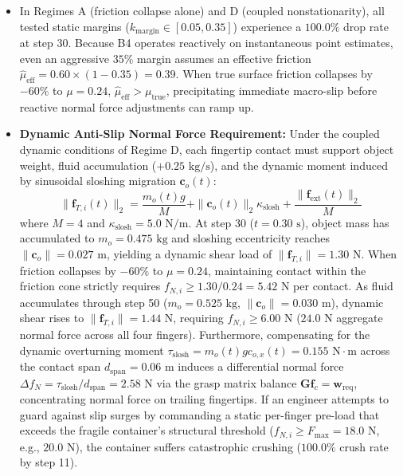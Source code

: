 \begin{itemize}
\begin{itemize}
        \item In Regimes A (friction collapse alone) and D (coupled nonstationarity), all tested static margins ($k_{\text{margin}} \in [0.05, 0.35]$) experience a $100.0\%$ drop rate at step 30. Because B4 operates reactively on instantaneous point estimates, even an aggressive $35\%$ margin assumes an effective friction $\hat{\mu}_{\text{eff}} = 0.60 \times (1 - 0.35) = 0.39$. When true surface friction collapses by $-60\%$ to $\mu = 0.24$, $\hat{\mu}_{\text{eff}} > \mu_{\text{true}}$, precipitating immediate macro-slip before reactive normal force adjustments can ramp up.
        \item \textbf{Dynamic Anti-Slip Normal Force Requirement:} Under the coupled dynamic conditions of Regime D, each fingertip contact must support object weight, fluid accumulation ($+0.25\text{ kg/s}$), and the dynamic moment induced by sinusoidal sloshing migration $\mathbf{c}_o(t)$:
        \begin{equation}
            \|\mathbf{f}_{T, i}(t)\|_2 = \frac{m_o(t) g}{M} + \|\mathbf{c}_o(t)\|_2 \kappa_{\text{slosh}} + \frac{\|\mathbf{f}_{\text{ext}}(t)\|_2}{M}
        \end{equation}
        where $M=4$ and $\kappa_{\text{slosh}} = 5.0\text{ N/m}$. At step 30 ($t = 0.30\text{ s}$), object mass has accumulated to $m_o = 0.475\text{ kg}$ and sloshing eccentricity reaches $\|\mathbf{c}_o\| = 0.027\text{ m}$, yielding a dynamic shear load of $\|\mathbf{f}_{T, i}\| = 1.30\text{ N}$. When friction collapses by $-60\%$ to $\mu = 0.24$, maintaining contact within the friction cone strictly requires $f_{N, i} \ge 1.30 / 0.24 = 5.42\text{ N}$ per contact. As fluid accumulates through step 50 ($m_o = 0.525\text{ kg}$, $\|\mathbf{c}_o\| = 0.030\text{ m}$), dynamic shear rises to $\|\mathbf{f}_{T, i}\| = 1.44\text{ N}$, requiring $f_{N, i} \ge 6.00\text{ N}$ ($24.0\text{ N}$ aggregate normal force across all four fingers). Furthermore, compensating for the dynamic overturning moment $\tau_{\text{slosh}} = m_o(t) g c_{o, x}(t) = 0.155\text{ N}\cdot\text{m}$ across the contact span $d_{\text{span}} = 0.06\text{ m}$ induces a differential normal force $\Delta f_N = \tau_{\text{slosh}} / d_{\text{span}} = 2.58\text{ N}$ via the grasp matrix balance $\mathbf{G}\mathbf{f}_c = \mathbf{w}_{\text{req}}$, concentrating normal force on trailing fingertips. If an engineer attempts to guard against slip surges by commanding a static per-finger pre-load that exceeds the fragile container's structural threshold ($f_{N, i} \ge F_{\max} = 18.0\text{ N}$, e.g., $20.0\text{ N}$), the container suffers catastrophic crushing ($100.0\%$ crush rate by step 11).

\end{itemize}
\end{itemize}
